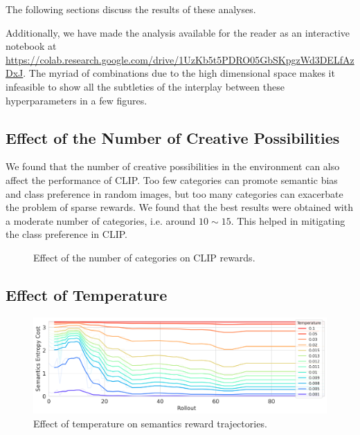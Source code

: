 The following sections discuss the results of these analyses.

Additionally, we have made the analysis available for the reader as an interactive notebook at \url{https://colab.research.google.com/drive/1UzKb5t5PDRO05GbSKpgzWd3DELfAzDxJ}.
The myriad of combinations due to the high dimensional space makes it infeasible to show all the subtleties of the interplay between these hyperparameters in a few figures.


\subsection{Effect of the Number of Creative Possibilities}
\label{sec:clip-categories}
We found that the number of creative possibilities in the environment can also affect the performance of CLIP.
Too few categories can promote semantic bias and class preference in random images, but too many categories can exacerbate the problem of sparse rewards.
We found that the best results were obtained with a moderate number of categories, i.e. around \(10 \sim 15\).
This helped in mitigating the class preference in CLIP.

\begin{figure}[H]
    \centering
    \caption{Effect of the number of categories on CLIP rewards.}
    \label{fig:clip-categories}
\end{figure}

\subsection{Effect of Temperature}
\label{sec:reg-temperature}
\begin{figure}[H]
    \centering
    \includegraphics[width=\textwidth]{images/temperature_comparison.png}
    \caption{Effect of temperature on semantics reward trajectories.}
    \label{fig:clip-temperature}
\end{figure}

